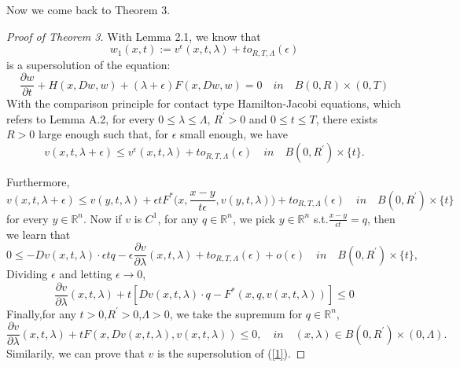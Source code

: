 \documentclass[preprint]{elsarticle}
\numberwithin{equation}{section}
\begin{document}
Now we come back to Theorem 3.

\begin{proof}[Proof of Theorem 3]
With Lemma 2.1, we know that %
\begin{equation}
    w_1(x,t):=v^{\epsilon}(x,t,\lambda)+to_{R,T,\Lambda}(\epsilon)
\end{equation}
is a supersolution of the equation:
\begin{equation}
    \frac{\partial w}{\partial t} +H(x,Dw,w)+(\lambda +\epsilon)F(x,Dw,w)=0 \quad in \quad B(0,R) \times (0,T)
\end{equation}
With the comparison principle for contact type Hamilton-Jacobi equations, which refers to \cite{ishii2022hamilton} Lemma A.2, for every $0 \leq \lambda \leq \Lambda$, $R^\prime >0$ and $0 \leq t \leq T$, there exists $R>0$ large enough such that, for $\epsilon$ small enough, we have
\begin{equation}
    v(x,t,\lambda+\epsilon) \leq v^{\epsilon}(x,t,\lambda)+to_{R,T,\Lambda}(\epsilon) \quad in \quad B(0,R^\prime) \times \{t\}.
\end{equation}

Furthermore,
\begin{equation}
    v(x,t,\lambda+\epsilon) \leq v(y,t,\lambda)+\epsilon tF^*\big(x,\frac{x-y}{t\epsilon},v(y,t,\lambda)\big)+to_{R,T,\Lambda}(\epsilon) \quad in \quad B(0,R^\prime) \times \{t\}
\end{equation}
for every $y \in \mathbb R^n$. Now if $v$ is $C^1$, for any $q \in \mathbb R^n$, we pick $y \in \mathbb R^n$ s.t.$\frac{x-y}{\epsilon t}=q$, then we learn that 
\begin{equation}
    0\leq -Dv(x,t,\lambda)\cdot \epsilon tq-\epsilon \frac{\partial v}{\partial \lambda}(x,t,\lambda)+to_{R,T,\Lambda}(\epsilon)+o(\epsilon)\quad in \quad B(0,R^\prime) \times \{t\},
\end{equation}
Dividing $\epsilon$ and letting $\epsilon \rightarrow 0$, 
\begin{equation}
    \frac{\partial v}{\partial \lambda}(x,t,\lambda)+t[Dv(x,t,\lambda)\cdot q-F^*(x,q,v(x,t,\lambda))]\leq 0
\end{equation}
Finally,for any $t>0$,$R^\prime >0$,$\Lambda >0$, we take the supremum for $q\in \mathbb R^n$,
\begin{equation}
    \frac{\partial v}{\partial \lambda}(x,t,\lambda)+tF(x,Dv(x,t,\lambda),v(x,t,\lambda))\leq 0, \quad in \quad (x,\lambda)\in B(0,R^\prime) \times (0,\Lambda).
\end{equation}
Similarily, we can prove that $v$ is the supersolution of (\ref{1}).
\end{proof}
\end{document}

